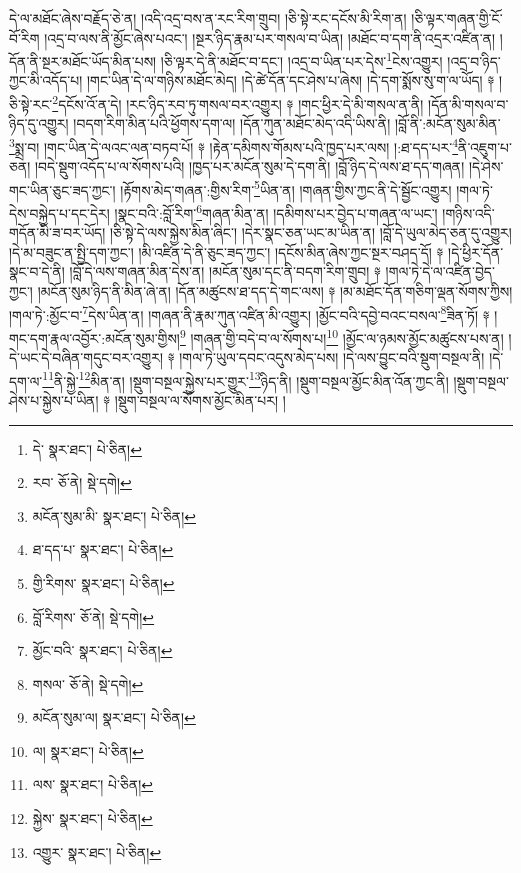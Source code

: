 དེ་ལ་མཐོང་ཞེས་བརྗོད་ཅེ་ན། །འདི་འདྲ་བས་ན་རང་རིག་གྲུབ། །ཅི་སྟེ་རང་དངོས་མི་རིག་ན། །ཅི་ལྟར་གཞན་གྱི་ངོ་བོ་རིག །འདྲ་བ་ལས་ནི་མྱོང་ཞེས་པའང་། །སྔར་ཉིད་རྣམ་པར་གསལ་བ་ཡིན། །མཐོང་བ་དག་ནི་འདྲར་འཛིན་ན། །དོན་ནི་སྔར་མཐོང་ཡོད་མིན་པས། །ཅི་ལྟར་དེ་ནི་མཐོང་བ་དང་། །འདྲ་བ་ཡིན་པར་དེས་\footnote{དེ་  སྣར་ཐང་།  པེ་ཅིན། }ངེས་འགྱུར། །འདྲ་བ་ཉིད་ཀྱང་མི་འདོད་པ། །གང་ཡིན་དེ་ལ་གཉིས་མཐོང་མེད། །དེ་ཚེ་དོན་དང་ཤེས་པ་ཞེས། །དེ་དག་སྨོས་སུ་ག་ལ་ཡོད། ༈ །ཅི་སྟེ་རང་\footnote{རབ་  ཅོ་ནེ།  སྡེ་དགེ། }དངོས་འོ་ན་དེ། །རང་ཉིད་རབ་ཏུ་གསལ་བར་འགྱུར། ༈ །གང་ཕྱིར་དེ་མི་གསལ་ན་ནི། །དོན་མི་གསལ་བ་ཉིད་དུ་འགྱུར། །བདག་རིག་མིན་པའི་ཕྱོགས་དག་ལ། །དོན་ཀུན་མཐོང་མེད་འདི་ཡིས་ནི། །བློ་ནི་:མངོན་སུམ་མིན་\footnote{མངོན་སུམ་མི་  སྣར་ཐང་།  པེ་ཅིན། }སྨྲ་བ། །གང་ཡིན་དེ་ལའང་ལན་བཏབ་པོ། ༈ །རྟེན་དམིགས་གོམས་པའི་ཁྱད་པར་ལས། །:ཐ་དད་པར་\footnote{ཐ་དད་པ་  སྣར་ཐང་།  པེ་ཅིན། }ནི་འཇུག་པ་ཅན། །བདེ་སྡུག་འདོད་པ་ལ་སོགས་པའི། །ཁྱད་པར་མངོན་སུམ་དེ་དག་ནི། །བློ་ཉིད་དེ་ལས་ཐ་དད་གཞན། །དེ་ཤེས་གང་ཡིན་ཅུང་ཟད་ཀྱང་། །རྟོགས་མེད་གཞན་:གྱིས་རིག་\footnote{གྱི་རིགས་  སྣར་ཐང་།  པེ་ཅིན། }ཡིན་ན། །གཞན་གྱིས་ཀྱང་ནི་དེ་སྦྱོང་འགྱུར། །གལ་ཏེ་དེས་བསྐྱེད་པ་དང་དེར། །སྣང་བའི་:བློ་རིག་\footnote{བློ་རིགས་  ཅོ་ནེ།  སྡེ་དགེ། }གཞན་མིན་ན། །དམིགས་པར་བྱེད་པ་གཞན་ལ་ཡང་། །གཉིས་འདི་གདོན་མི་ཟ་བར་ཡོད། །ཅི་སྟེ་དེ་ལས་སྐྱེས་མིན་ཞིང་། །དེར་སྣང་ཅན་ཡང་མ་ཡིན་ན། །བློ་དེ་ཡུལ་མེད་ཅན་དུ་འགྱུར། །དེ་མ་བཟུང་ན་སྤྱི་དག་ཀྱང་། །མི་འཛིན་དེ་ནི་ཅུང་ཟད་ཀྱང་། །དངོས་མིན་ཞེས་ཀྱང་སྔར་བཤད་དོ། ༈ །དེ་ཕྱིར་དོན་སྣང་བ་དེ་ནི། །བློ་དེ་ལས་གཞན་མིན་དེས་ན། །མངོན་སུམ་དང་ནི་བདག་རིག་གྲུབ། ༈ །གལ་ཏེ་དེ་ལ་འཛིན་བྱེད་ཀྱང་། །མངོན་སུམ་ཉིད་ནི་མིན་ཞེ་ན། །དོན་མཚུངས་ཐ་དད་དེ་གང་ལས། ༈ །མ་མཐོང་དོན་གཅིག་ལྡན་སོགས་ཀྱིས། །གལ་ཏེ་:མྱོང་བ་\footnote{མྱོང་བའི་  སྣར་ཐང་།  པེ་ཅིན། }དེས་ཡིན་ན། །གཞན་ནི་རྣམ་ཀུན་འཛིན་མི་འགྱུར། །མྱོང་བའི་དབྱེ་བའང་བསལ་\footnote{གསལ་  ཅོ་ནེ།  སྡེ་དགེ། }ཟིན་ཏོ། ༈ །གང་དག་རྣལ་འབྱོར་:མངོན་སུམ་གྱིས།\footnote{མངོན་སུམ་ལ།  སྣར་ཐང་།  པེ་ཅིན། } །གཞན་གྱི་བདེ་བ་ལ་སོགས་པ།\footnote{ལ།  སྣར་ཐང་།  པེ་ཅིན། } །མྱོང་ལ་ཉམས་མྱོང་མཚུངས་པས་ན། །དེ་ཡང་དེ་བཞིན་གདུང་བར་འགྱུར། ༈ །གལ་ཏེ་ཡུལ་དབང་འདུས་མེད་པས། །དེ་ལས་བྱུང་བའི་སྡུག་བསྔལ་ནི། །དེ་དག་ལ་\footnote{ལས་  སྣར་ཐང་།  པེ་ཅིན། }ནི་སྐྱེ་\footnote{སྐྱེས་  སྣར་ཐང་།  པེ་ཅིན། }མིན་ན། །སྡུག་བསྔལ་སྐྱེས་པར་གྱུར་\footnote{འགྱུར་  སྣར་ཐང་།  པེ་ཅིན། }ཉིད་ནི། །སྡུག་བསྔལ་མྱོང་མིན་འོན་ཀྱང་ནི། །སྡུག་བསྔལ་ཤེས་པ་སྐྱེས་པ་ཡིན། ༈ །སྡུག་བསྔལ་ལ་སོགས་མྱོང་མིན་པར། །

